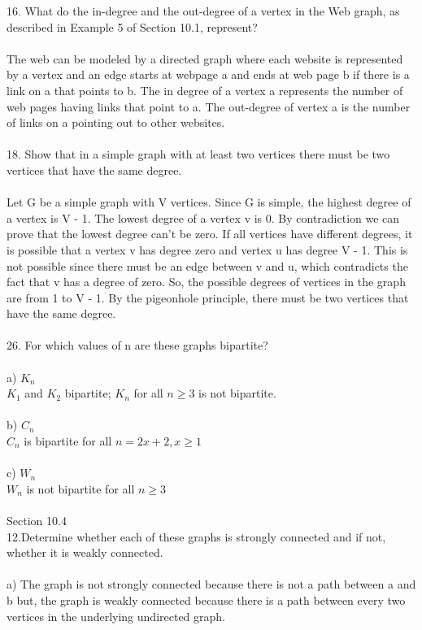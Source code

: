 \documentclass[11pt, oneside]{article}   	%
\begin{document}
16. What do the in-degree and the out-degree of a vertex in the Web graph, as described in Example 5 of Section 10.1, represent?\\\\
The web can be modeled by a directed graph where each website is represented by a vertex and an edge starts at webpage a and ends at web page b if there is a link on a that points to b. The in degree of a vertex a represents the number of web pages having links that point to a. The out-degree of vertex a is the number of links on a pointing out to other websites. \\\\
18. Show that in a simple graph with at least two vertices there must be two vertices that have the same degree.\\\\
Let G be a simple graph with V vertices. Since G is simple, the highest degree of a vertex is V - 1. The lowest degree of a vertex v is 0. By contradiction we can prove that the lowest degree can't be zero. If all vertices have different degrees, it is possible that a vertex v has degree zero and vertex u has degree V - 1. This is not possible since there must be an edge between v and u, which contradicts the fact that v has a degree of zero. So, the possible degrees of vertices in the graph are from 1 to V - 1. By the pigeonhole principle, there must be two vertices that have the same degree. \\\\
26. For which values of n are these graphs bipartite?\\\\
a) $K_n$\\
$K_1$ and $K_2$  bipartite; $K_n$ for all $n\geq 3$ is not bipartite.\\\\
b) $C_n$\\
$C_n$ is bipartite for all $n = 2x + 2, x\geq 1$\\\\
c) $W_n$\\
$W_n$ is not bipartite for all $n\geq 3$\\\\
Section 10.4\\
12.Determine whether each of these graphs is strongly connected and if not, whether it is weakly connected.\\\\
a) The graph is not strongly connected because there is not a path between a and b but, the graph is weakly connected because there is a path between every two vertices in the underlying undirected graph. \\\\
\end{document}
